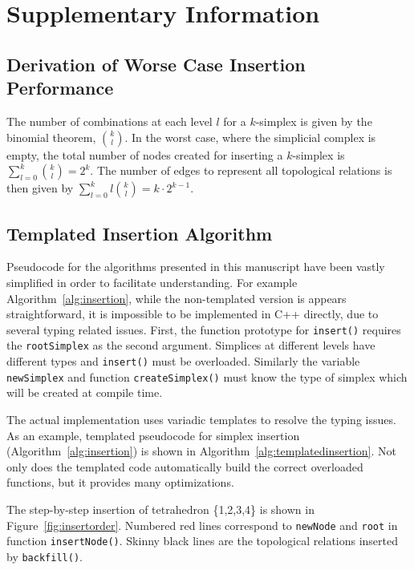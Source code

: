 \section{Supplementary Information}
\subsection{Derivation of Worse Case Insertion Performance}
\par The number of combinations at each level $l$ for a $k$-simplex is given by the binomial theorem, $\binom{k}{l}$.
In the worst case, where the simplicial complex is empty, the total number of nodes created for inserting a $k$-simplex is $\sum_{l=0}^{k}\binom{k}{l} = 2^k$.
The number of edges to represent all topological relations is then given by $\sum_{l=0}^{k}l\binom{k}{l} = k\cdot 2^{k-1}$.

\subsection{Templated Insertion Algorithm}

\par Pseudocode for the algorithms presented in this manuscript have been vastly simplified in order to facilitate understanding.
For example Algorithm~\ref{alg:insertion}, while the non-templated version is appears straightforward, it is impossible to be implemented in C++ directly, due to several typing related issues.
First, the function prototype for \verb|insert()| requires the \verb|rootSimplex| as the second argument.
Simplices at different levels have different types and \verb|insert()| must be overloaded.
Similarly the variable \verb|newSimplex| and function \verb|createSimplex()| must know the type of simplex which will be created at compile time.

\par The actual implementation uses variadic templates to resolve the typing issues.
As an example, templated pseudocode for simplex insertion (Algorithm~\ref{alg:insertion}) is shown in Algorithm~\ref{alg:templatedinsertion}.
Not only does the templated code automatically build the correct overloaded functions, but it provides many optimizations.

\par The step-by-step insertion of tetrahedron \{1,2,3,4\} is shown in Figure~\ref{fig:insertorder}.
Numbered red lines correspond to \verb|newNode| and \verb|root| in function \verb|insertNode()|.
Skinny black lines are the topological relations inserted by \verb|backfill()|.


